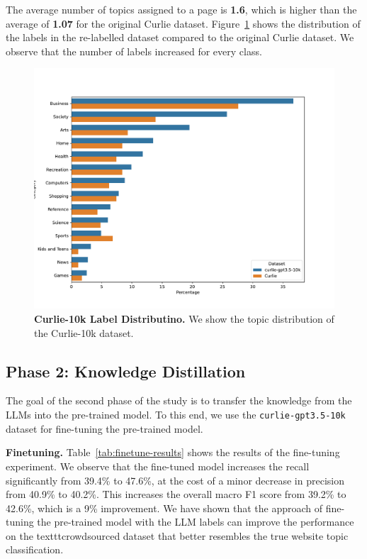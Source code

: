 The average number of topics assigned to a page is \textbf{1.6}, which is higher than the average of \textbf{1.07} for the original Curlie dataset. Figure~\ref{fig:label-distribution-comparison} shows the distribution of the labels in the re-labelled dataset compared to the original Curlie dataset. We observe that the number of labels increased for every class.

\begin{figure}[!ht]
    \centering
    \includegraphics[width=.8\columnwidth]{figures/class_distribution_comparison.pdf}
    \caption{\textbf{Curlie-10k Label Distributino.} We show the topic distribution of the Curlie-10k dataset.}
    \label{fig:label-distribution-comparison}
\end{figure}


\subsection*{Phase 2: Knowledge Distillation}


The goal of the second phase of the study is to transfer the knowledge from the LLMs into the pre-trained model. 
To this end, we use the \texttt{curlie-gpt3.5-10k} dataset for fine-tuning the pre-trained model.

\textbf{Finetuning.} Table~\ref{tab:finetune-results} shows the results of the fine-tuning experiment. 
We observe that the fine-tuned model increases the recall significantly from 39.4\% to 47.6\%, at the cost of a minor decrease in precision from 40.9\% to 40.2\%. 
This increases the overall macro F1 score from 39.2\% to 42.6\%, which is a 9\% improvement. 
We have shown that the approach of fine-tuning the pre-trained model with the LLM labels can improve the performance on the texttt{crowdsourced} dataset that better resembles the true website topic classification.

